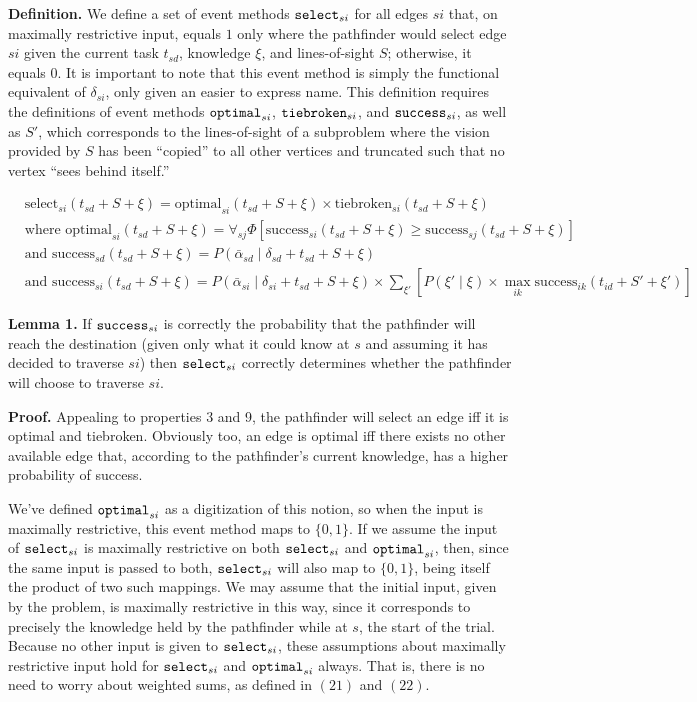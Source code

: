 \documentclass{article}
\begin{document}
\textbf{Definition.} We define a set of event methods
${\tt select}_{si}$ for all edges $si$ that, on maximally restrictive
input, equals $1$ only where the pathfinder would select edge $si$ given
the current task $t_{sd}$, knowledge $\xi$, and lines-of-sight $S$;
otherwise, it equals $0$. It is important to note that this event method
is simply the functional equivalent of $\delta_{si}$, only given an
easier to express name. This definition requires the definitions of
event methods ${\tt optimal}_{si}$, ${\tt tiebroken}_{si}$, and
${\tt success}_{si}$, as well as $S'$, which corresponds to the
lines-of-sight of a subproblem where the vision provided by $S$ has been
``copied'' to all other vertices and truncated such that no vertex
``sees behind itself.''

\begin{align*}
    &\text{select}_{si}(t_{sd} + S + \xi) =
        \text{optimal}_{si}(t_{sd} + S + \xi) \times
        \text{tiebroken}_{si}(t_{sd} + S + \xi) \\
    &\text{where optimal}_{si}(t_{sd} + S + \xi) = \forall_{sj} \Phi \left[
        \text{success}_{si}(t_{sd} + S + \xi) \ge
        \text{success}_{sj}(t_{sd} + S + \xi)
    \right] \\
    &\text{and success}_{sd}(t_{sd} + S + \xi) =
        P(\bar \alpha_{sd} \mid \delta_{sd} + t_{sd} + S + \xi) \\
    &\text{and success}_{si}(t_{sd} + S + \xi) =
        P(\bar \alpha_{si} \mid \delta_{si} + t_{sd} + S + \xi) \times
        \sum_{\xi'} \left[ P(\xi' \mid \xi) \times \max_{ik} \text{success}_{ik}(t_{id} + S' + \xi') \right]
\end{align*}

\textbf{Lemma 1.} If ${\tt success}_{si}$ is correctly the probability
that the pathfinder will reach the destination (given only what it could
know at $s$ and assuming it has decided to traverse $si$) then
${\tt select}_{si}$ correctly determines whether the pathfinder will
choose to traverse $si$.

\textbf{Proof.} Appealing to properties 3 and 9, the pathfinder will
select an edge iff it is optimal and tiebroken. Obviously too, an edge
is optimal iff there exists no other available edge that, according to
the pathfinder's current knowledge, has a higher probability of success.

We've defined ${\tt optimal}_{si}$ as a digitization of this notion, so
when the input is maximally restrictive, this event method maps to
$\{0, 1\}$. If we assume the input of ${\tt select}_{si}$ is maximally
restrictive on both ${\tt select}_{si}$ and ${\tt optimal}_{si}$, then,
since the same input is passed to both, ${\tt select}_{si}$ will also
map to $\{0, 1\}$, being itself the product of two such mappings. We may
assume that the initial input, given by the problem, is maximally
restrictive in this way, since it corresponds to precisely the knowledge
held by the pathfinder while at $s$, the start of the trial. Because no
other input is given to ${\tt select}_{si}$, these assumptions about
maximally restrictive input hold for ${\tt select}_{si}$ and
${\tt optimal}_{si}$ always. That is, there is no need to worry about
weighted sums, as defined in $(21)$ and $(22)$.
\end{document}
